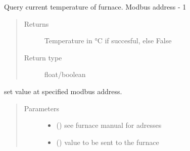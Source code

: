 \documentclass[letterpaper,10pt,english]{sphinxmanual}
\begin{document}
\begin{fulllineitems}
\begin{fulllineitems}
\begin{quote}
\begin{description}
\end{description}\end{quote}

\end{fulllineitems}


\begin{fulllineitems}
\label{\detokenize{source/laboratory.drivers:laboratory.drivers.furnace.Furnace.indicated}}
Query current temperature of furnace.
Modbus address - 1
\begin{quote}\begin{description}
\item[{Returns}] \leavevmode
Temperature in °C if succesful, else False

\item[{Return type}] \leavevmode
float/boolean

\end{description}\end{quote}

\end{fulllineitems}


\begin{fulllineitems}
\label{\detokenize{source/laboratory.drivers:laboratory.drivers.furnace.Furnace.other}}
set value at specified modbus address.
\begin{quote}\begin{description}
\item[{Parameters}] \leavevmode\begin{itemize}
\item {} 
 (\sphinxstyleliteralemphasis{\sphinxupquote{, }}) \textendash{} see furnace manual for adresses

\item {} 
 (\sphinxstyleliteralemphasis{\sphinxupquote{, }}) \textendash{} value to be sent to the furnace


\end{itemize}
\end{description}
\end{quote}
\end{fulllineitems}
\end{fulllineitems}
\end{document}
